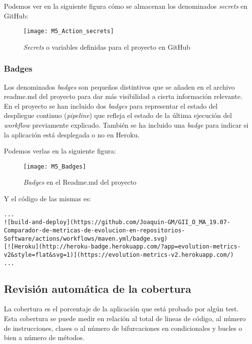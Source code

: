 Podemos ver en la siguiente figura cómo se almacenan los denominados \textit{secrets} en GitHub:

\begin{figure}[!h]
	\centering
	\texttt{[image: M5\_Action\_secrets]}
	\caption{\textit{Secrets} o variables definidas para el proyecto en GitHub}\label{fig:M5_Action_secrets}
\end{figure}
\FloatBarrier

\subsubsection{Badges}
Los denominados \textit{badges} son pequeños distintivos que se añaden en el archivo readme.md del proyecto para dar más visibilidad a cierta información relevante.
En el proyecto se han incluido dos \textit{badges} para representar el estado del despliegue continuo (\textit{pipeline}) que refleja el estado de la última ejecución del \textit{workflow} previamente explicado. También se ha incluido una \textit{badge} para indicar si la aplicación está desplegada o no en Heroku.

Podemos verlas en la siguiente figura:

\begin{figure}[!h]
	\centering
	\texttt{[image: M5\_Badges]}
	\caption{\textit{Badges} en el Readme.md del proyecto}\label{fig:M5_Badges}
\end{figure}
\FloatBarrier

Y el código de las mismas es:\\

\begin{minipage}{\linewidth}
{\tiny
\begin{verbatim}
...
![build-and-deploy](https://github.com/Joaquin-GM/GII_O_MA_19.07-Comparador-de-metricas-de-evolucion-en-repositorios-Software/actions/workflows/maven.yml/badge.svg)
[![Heroku](http://heroku-badge.herokuapp.com/?app=evolution-metrics-v2&style=flat&svg=1)](https://evolution-metrics-v2.herokuapp.com/)
...
\end{verbatim}
}
\end{minipage}

\subsection{Revisión automática de la cobertura}

La cobertura es el porcentaje de la aplicación que está probado por algún test. Esta cobertura se puede medir en relación al total de lineas de código, al número de instrucciones, clases o al número de bifurcaciones en condicionales y bucles o bien a número de métodos.

